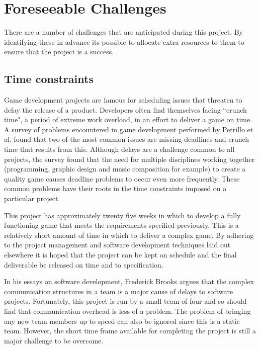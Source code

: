 \section{Foreseeable Challenges}
\label{section:foreseeable_challenges}

There are a number of challenges that are anticipated during this project. By identifying
these in advance its possible to allocate extra resources to them to ensure that the
project is a success.

\subsection{Time constraints}

Game development projects are famous for scheduling issues that threaten to delay the
release of a product. Developers often find themselves facing ``crunch time", a period
of extreme work overload, in an effort to deliver a game on time.\cite[-1em]{groen2011}
A survey of problems encountered in game development performed by Petrillo et al. found
that two of the most common issues are missing deadlines and crunch time that results 
from this.\cite[1em]{petrillo2009} Although delays are a challenge common to all projects,
the survey found that the need for multiple disciplines working together (programming,
graphic design and music composition for example) to create a quality game causes
deadline problems to occur even more frequently. These common problems have their roots
in the time constraints imposed on a particular project.

This project has approximately twenty five weeks in which to develop a fully functioning
game that meets the requirements specified previously. This is a relatively short amount
of time in which to deliver a complex game. By adhering to the project management
and software development techniques laid out elsewhere it is hoped that the project
can be kept on schedule and the final deliverable be released on time and to specification.

In his essays on software development, Frederick Brooks argues that the complex
communication structures in a team is a major cause of delays to software projects.\cite{brooks1995}
Fortunately, this project is run by a small team of four and so should find that
communication overhead is less of a problem. The problem of bringing any new team
members up to speed can also be ignored since this is a static team.
However, the short time frame available for completing the project is still a
major challenge to be overcome.

